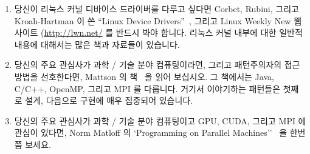 \begin{enumerate}

\item	당신이 리눅스 커널 디바이스 드라이버를 다루고 싶다면 Corbet, Rubini,
	그리고 Kroah-Hartman 이 쓴 ``Linux Device
	Drivers''~\cite{CorbetRubiniKroahHartman}, 그리고 Linux Weekly New
	웹사이트 (\url{http://lwn.net/} 를 반드시 봐야 합니다.
	리눅스 커널 내부에 대한 일반적 내용에 대해서는 많은 책과 자료들이
	있습니다.


\item	당신의 주요 관심사가 과학 / 기술 분야 컴퓨팅이라면, 그리고 패턴주의자의
	접근방법을 선호한다면, Mattson 의 책~\cite{Mattson2005Textbook} 을 읽어
	보십시오.
	그 책에서는 Java, C/C++, OpenMP, 그리고 MPI 를 다룹니다.
	거기서 이야기하는 패턴들은 첫째로 설계, 다음으로 구현에 매우 집중되어
	있습니다.


\item	당신의 주요 관심사가 과학 / 기술 분야 컴퓨팅이고 GPU, CUDA, 그리고 MPI
	에 관심이 있다면, Norm Matloff 의 `Programming on Parallel
	Machines''~\cite{NormMatloff2013ParProcBook} 을 한번쯤 보세요.



\end{enumerate}
